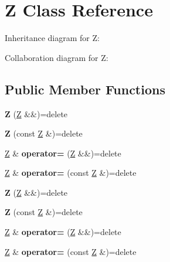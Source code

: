 \hypertarget{struct_z}{}\section{Z Class Reference}
\label{struct_z}


Inheritance diagram for Z\+:


Collaboration diagram for Z\+:
\subsection*{Public Member Functions}
\begin{DoxyCompactItemize}
\item 
\mbox{\label{struct_z_a83ca4074f8dddda563228656fd1d2233}} 
{\bfseries Z} (\mbox{\hyperlink{struct_z}{Z}} \&\&)=delete
\item 
\mbox{\label{struct_z_a22b06706320eb8008edc7c409e34b611}} 
{\bfseries Z} (const \mbox{\hyperlink{struct_z}{Z}} \&)=delete
\item 
\mbox{\label{struct_z_a8dcd931bfa0764b04e9558c4f15314da}} 
\mbox{\hyperlink{struct_z}{Z}} \& {\bfseries operator=} (\mbox{\hyperlink{struct_z}{Z}} \&\&)=delete
\item 
\mbox{\label{struct_z_af54fd425f5fa0cfaa840130fdbb51d03}} 
\mbox{\hyperlink{struct_z}{Z}} \& {\bfseries operator=} (const \mbox{\hyperlink{struct_z}{Z}} \&)=delete
\item 
\mbox{\label{struct_z_a83ca4074f8dddda563228656fd1d2233}} 
{\bfseries Z} (\mbox{\hyperlink{struct_z}{Z}} \&\&)=delete
\item 
\mbox{\label{struct_z_a22b06706320eb8008edc7c409e34b611}} 
{\bfseries Z} (const \mbox{\hyperlink{struct_z}{Z}} \&)=delete
\item 
\mbox{\label{struct_z_a8dcd931bfa0764b04e9558c4f15314da}} 
\mbox{\hyperlink{struct_z}{Z}} \& {\bfseries operator=} (\mbox{\hyperlink{struct_z}{Z}} \&\&)=delete
\item 
\mbox{\label{struct_z_af54fd425f5fa0cfaa840130fdbb51d03}} 
\mbox{\hyperlink{struct_z}{Z}} \& {\bfseries operator=} (const \mbox{\hyperlink{struct_z}{Z}} \&)=delete

\end{DoxyCompactItemize}
